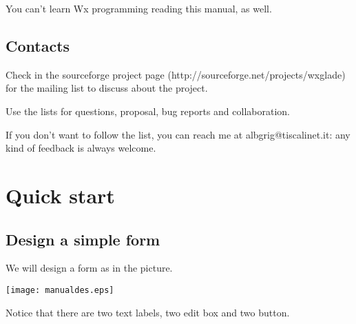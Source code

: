 \documentclass[a4paper,10pt]{book}
\begin{document}
                                        
                                        You can't learn Wx programming reading this manual, as well.
                                         
                                        
                                        
\section{Contacts}
                                            Check in the sourceforge project page (http://sourceforge.net/projects/wxglade)
                                             for the mailing list to discuss about the project.
                                            
                                            
                                            Use the lists for questions, proposal, bug reports and collaboration.
                                            
                                            
                                            If you don't want to follow the list, you can reach me at albgrig@tiscalinet.it:
                                             any kind of feedback is always welcome.\newpage

\chapter{Quick start}
                                                
\section{Design a simple form}
                                                    
                                                    
                                                    
                                                    We will design a form as in the picture.
                                                    
                                                    
                                                    \texttt{[image: manualdes.eps]}

                                                    
                                                    
                                                    Notice that there are two text labels, two edit box and two button.
                                                    
\end{document}
